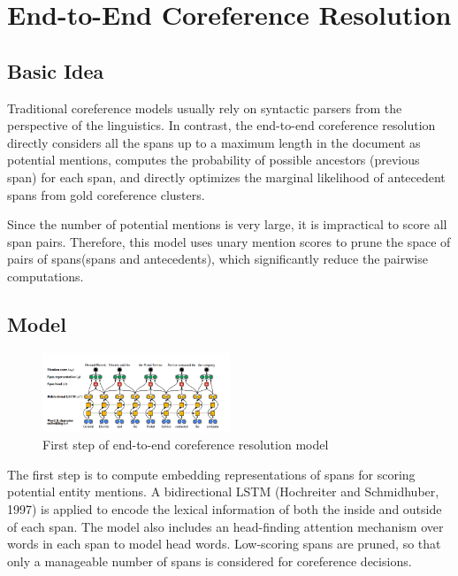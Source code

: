 \documentclass[11pt]{article}
\begin{document}
\section{End-to-End Coreference Resolution}

\subsection{Basic Idea}
Traditional coreference models usually rely on syntactic parsers from the perspective of the linguistics. In contrast, the end-to-end coreference resolution directly considers all the spans up to a maximum length in the document as potential mentions,  computes the probability of possible ancestors (previous span) for each span, and directly optimizes the marginal likelihood of antecedent spans from gold coreference clusters.

Since the number of potential mentions is very large, it is impractical to score all span pairs. Therefore, this model uses unary mention scores to prune the space of pairs of spans(spans and antecedents), which significantly reduce the pairwise computations.

\subsection{Model}

\begin{figure}[h]
                
 \includegraphics[width=0.5\textwidth]{02.jpg}
 \caption{First step of end-to-end coreference resolution model}
                
\end{figure}

The first step is to compute embedding representations of spans for scoring potential entity mentions. A  bidirectional LSTM (Hochreiter and Schmidhuber, 1997) is applied to encode the lexical information of both the inside and outside of each span. The model also includes an head-finding attention mechanism over words in each span to model head words.
Low-scoring spans are pruned, so that only a manageable number of spans is considered for coreference decisions.
\end{document}
